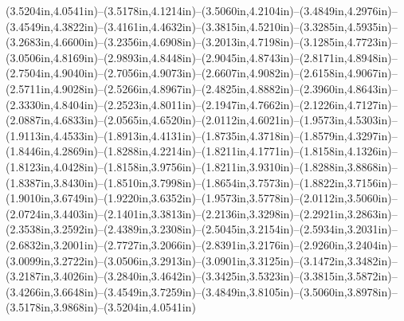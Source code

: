 (3.5204in,4.0541in)--(3.5178in,4.1214in)--(3.5060in,4.2104in)--(3.4849in,4.2976in)--(3.4549in,4.3822in)--(3.4161in,4.4632in)--(3.3815in,4.5210in)--(3.3285in,4.5935in)--(3.2683in,4.6600in)--(3.2356in,4.6908in)--(3.2013in,4.7198in)--(3.1285in,4.7723in)--(3.0506in,4.8169in)--(2.9893in,4.8448in)--(2.9045in,4.8743in)--(2.8171in,4.8948in)--(2.7504in,4.9040in)--(2.7056in,4.9073in)--(2.6607in,4.9082in)--(2.6158in,4.9067in)--(2.5711in,4.9028in)--(2.5266in,4.8967in)--(2.4825in,4.8882in)--(2.3960in,4.8643in)--(2.3330in,4.8404in)--(2.2523in,4.8011in)--(2.1947in,4.7662in)--(2.1226in,4.7127in)--(2.0887in,4.6833in)--(2.0565in,4.6520in)--(2.0112in,4.6021in)--(1.9573in,4.5303in)--(1.9113in,4.4533in)--(1.8913in,4.4131in)--(1.8735in,4.3718in)--(1.8579in,4.3297in)--(1.8446in,4.2869in)--(1.8288in,4.2214in)--(1.8211in,4.1771in)--(1.8158in,4.1326in)--(1.8123in,4.0428in)--(1.8158in,3.9756in)--(1.8211in,3.9310in)--(1.8288in,3.8868in)--(1.8387in,3.8430in)--(1.8510in,3.7998in)--(1.8654in,3.7573in)--(1.8822in,3.7156in)--(1.9010in,3.6749in)--(1.9220in,3.6352in)--(1.9573in,3.5778in)--(2.0112in,3.5060in)--(2.0724in,3.4403in)--(2.1401in,3.3813in)--(2.2136in,3.3298in)--(2.2921in,3.2863in)--(2.3538in,3.2592in)--(2.4389in,3.2308in)--(2.5045in,3.2154in)--(2.5934in,3.2031in)--(2.6832in,3.2001in)--(2.7727in,3.2066in)--(2.8391in,3.2176in)--(2.9260in,3.2404in)--(3.0099in,3.2722in)--(3.0506in,3.2913in)--(3.0901in,3.3125in)--(3.1472in,3.3482in)--(3.2187in,3.4026in)--(3.2840in,3.4642in)--(3.3425in,3.5323in)--(3.3815in,3.5872in)--(3.4266in,3.6648in)--(3.4549in,3.7259in)--(3.4849in,3.8105in)--(3.5060in,3.8978in)--(3.5178in,3.9868in)--(3.5204in,4.0541in)

